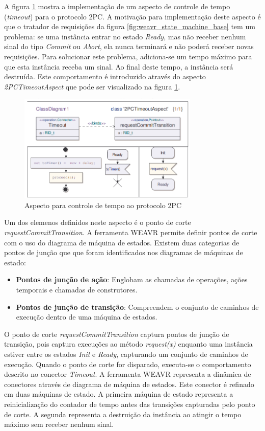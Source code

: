 A figura \ref{fig:weavr_timeout} mostra a implementação de um aspecto de controle de tempo (\textit{timeout}) para o protocolo 2PC. A motivação para
implementação deste aspecto é que o tratador de requisições da figura \ref{fig:weavr_state_machine_base} tem um problema: se uma instância entrar no
estado \textit{Ready}, mas não receber nenhum sinal do tipo \textit{Commit} ou \textit{Abort}, ela nunca terminará e não poderá receber
novas requisições. Para solucionar este problema, adiciona-se um tempo máximo para que esta instância receba um sinal. Ao final deste tempo, a
instância será destruída. Este comportamento é introduzido através do aspecto \textit{2PCTimeoutAspect} que pode ser visualizado na figura
\ref{fig:weavr_timeout}. 

\begin{figure}
	\centering
	\includegraphics[width=325px]{img/weavr_timeout.png}
	\caption{Aspecto para controle de tempo ao protocolo 2PC}\label{fig:weavr_timeout}
\end{figure}

Um dos elemenos definidos neste aspecto é o ponto de corte \textit{requestCommitTransition}. A ferramenta WEAVR permite definir pontos de 
corte com o uso do diagrama de máquina de estados. Existem duas categorias de pontos de junção que que foram identificados nos diagramas de máquinas
de estado:

\begin{itemize}
  \item \textbf{Pontos de junção de ação}: Englobam as chamadas de operações, ações temporais e chamadas de construtores. 
  \item \textbf{Pontos de junção de transição}: Compreendem o conjunto de caminhos de execução dentro de uma máquina de estados.
\end{itemize}

O ponto de corte \textit{requestCommitTransition} captura pontos de junção de transição, pois captura execuções ao método \textit{request(x)} enquanto
uma instância estiver entre os estados \textit{Init} e \textit{Ready}, capturando um conjunto de caminhos de execução. Quando o ponto de corte for
disparado, executa-se o comportamento descrito no conector \textit{Timeout}. A ferramenta WEAVR representa a dinâmica de conectores através de
diagrama de máquina de estados. Este conector é refinado em duas máquinas de estado. A primeira máquina de estado representa a reinicialização do
contador de tempo antes das transições capturadas pelo ponto de corte. A segunda representa a destruição da instância ao atingir o tempo máximo sem
receber nenhum sinal.

